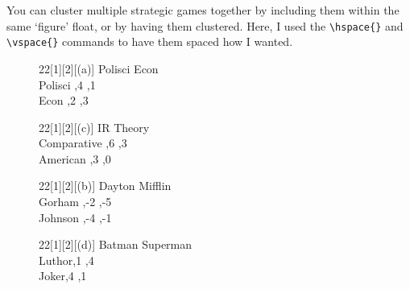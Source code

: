 \documentclass[10.5pt]{article}
\begin{document}
You can cluster multiple strategic games together by including them within the same `figure' float, or by having them clustered.  Here, I used the \verb+\hspace{}+ and \verb+\vspace{}+ commands to have them spaced how I wanted.


\begin{figure}[h!]
\begin{center}
\begin{footnotesize}
\begin{game}{2}{2}[1][2][(a)]
        \> Polisci \> Econ \\
Polisci ,4     ,1  \\
Econ    ,2     ,3  \\
\end{game}\hspace{.5in}
\begin{game}{2}{2}[1][2][(c)]
             \> IR   \> Theory   \\
Comparative  ,6  ,3      \\
American     ,3  ,0      \\
\end{game}
\end{footnotesize}
\end{center}
\end{figure}
\vspace{-.3in}
\begin{figure}[h!]
\begin{center}
\begin{footnotesize}
\begin{game}{2}{2}[1][2][(b)]
        \> Dayton \> Mifflin \\
Gorham  ,-2  ,-5   \\
Johnson ,-4  ,-1   \\
\end{game}\hspace{.5in}
\begin{game}{2}{2}[1][2][(d)]
             \> Batman \> Superman \\
Luthor,1  ,4     \\
Joker,4  ,1     \\
\end{game}
\end{footnotesize}
\end{center}
\end{figure}
\end{document}
